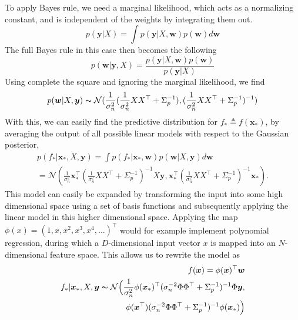 To apply Bayes rule, we need a marginal likelihood, which acts as a normalizing constant, and is independent of the weights by integrating them out. 
\begin{equation}%
	p(\bm{y}|X) = \int p(\bm{y}|X,\bm{w}) p(\bm{w}) d\bm{w}
\label{eq: Marginal likelihood as normalizing constant}
\end{equation}
The full Bayes rule in this case then becomes the following
\begin{equation}%
	p(\bm{w}|\bm{y},X) = \frac{p(\bm{y}|X,\bm{w})p(\bm{w})}{p(\bm{y}|X)}
\label{Bayes Rule for linear Regression}
\end{equation}
Using complete the square and ignoring the marginal likelihood, we find
\begin{equation}%
	p(\bm{w}|X,\bm{y}) \thicksim \mathcal{N}(\frac{1}{\sigma_n^2}(\frac{1}{\sigma_n^2}XX^{\top}+ \Sigma_p^{-1}), (\frac{1}{\sigma_n^2}XX^{\top}+ \Sigma_p^{-1})^{-1})
\label{Unnormalized posterior}
\end{equation}
With this, we can easily find the predictive distribution for $f_* \triangleq f(\bm{x}_*)$, by averaging the output of all possible linear models with respect to the Gaussian posterior,
\begin{subequations}%
	\label{eq:Gaussian posterior predictive distribution}
	\begin{align}
		p(f_*|\bm{x}_*,X,\bm{y}) = \int p(f_*|\bm{x}_*, \bm{w})p(\bm{w}|X,\bm{y}) d\bm{w}    \label{eq:predictive distribution 1} \\
		= \mathcal{N}(\frac{1}{\sigma_n^2}\bm{x}_*^{\top}(\frac{1}{\sigma_n^2}XX^{\top}+ \Sigma_p^{-1})^{-1}X\bm{y}, \bm{x}_*^{\top}(\frac{1}{\sigma_n^2}XX^{\top}+ \Sigma_p^{-1})^{-1}\bm{x}_*).         \label{eq: predicitve distribution 2}
	\end{align}
\end{subequations}
This model can easily be expanded by transforming the input into some high dimensional space using a set of basis functions and subsequently applying the linear model in this higher dimensional space. Applying the map $\phi(x) = (1,x,x^2,x^3,x^4,...)^{\top}$ would for example implement polynomial regression, during which a $D$-dimensional input vector $x$ is mapped into an $N$-dimensional feature space. This allows us to rewrite the model as
\begin{subequations}%
	\label{eq:Feature Space Gaussian process}
	\begin{align}
	f(\bm{x}) = \phi(\bm{x})^{\top} \bm{w}         \label{eq: feature space model} \\
	f_*|\bm{x}_*,X,\bm{y}  \thicksim \mathcal{N}\Big( \frac{1}{\sigma_n^2}\phi(\bm{x}_*)^{\top}(\sigma_n^{-2}\Phi \Phi^{\top} + \Sigma_p^{-1})^{-1} \Phi \bm{y} , \label{eq: predictive distribution mean} \\
	 \phi(\bm{x}^{\top})(\sigma_n^{-2}\Phi \Phi^{\top} + \Sigma_p^{-1})^{-1} \phi(\bm{x}_*) \Big)        \label{eq: predictive distribution covariance} 
	\end{align}
\end{subequations}
